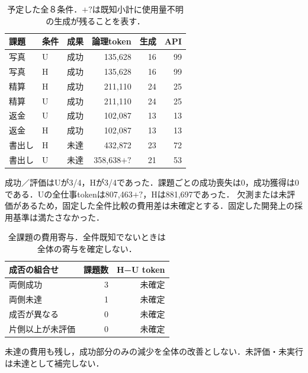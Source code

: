 \begin{table}[tb]
\centering\footnotesize\setlength{\tabcolsep}{3pt}
\caption{予定した全８条件．$+?$は既知小計に使用量不明の生成が残ることを表す．}
\begin{tabular}{lllrrr}
課題 & 条件 & 成果 & 論理token & 生成 & API \\ \hline
写真 & U & 成功 & 135,628 & 16 & 99 \\
写真 & H & 成功 & 135,628 & 16 & 99 \\
精算 & H & 成功 & 211,110 & 24 & 25 \\
精算 & U & 成功 & 211,110 & 24 & 25 \\
返金 & U & 成功 & 102,087 & 13 & 13 \\
返金 & H & 成功 & 102,087 & 13 & 13 \\
書出し & H & 未達 & 432,872 & 23 & 72 \\
書出し & U & 未達 & 358,638$+?$ & 21 & 53 \\
\hline\end{tabular}
\end{table}
成功／評価はUが3/4，Hが3/4であった．課題ごとの成功喪失は0，成功獲得は0である．Uの全仕事tokenは807,463$+?$，Hは881,697であった．
欠測または未評価があるため，固定した全件比較の費用差は未確定とする．固定した開発上の採用基準は満たさなかった．
\begin{table}[tb]
\centering\footnotesize\setlength{\tabcolsep}{3pt}
\caption{全課題の費用寄与．全件既知でないときは全体の寄与を確定しない．}
\begin{tabular}{lrr}
成否の組合せ & 課題数 & H−U token \\ \hline
両側成功 & 3 & 未確定 \\
両側未達 & 1 & 未確定 \\
成否が異なる & 0 & 未確定 \\
片側以上が未評価 & 0 & 未確定 \\
\hline\end{tabular}
\end{table}
未達の費用も残し，成功部分のみの減少を全体の改善としない．未評価・未実行は未達として補完しない．
